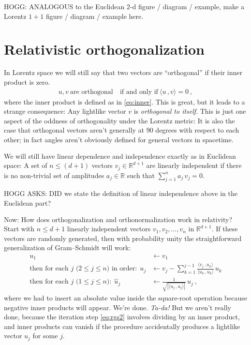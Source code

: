 \documentclass{article}
\newcommand{\inner}[2]{\langle{#1}\,,{#2}\rangle}
\newcommand{\plus}{\!+\!} %
\begin{document}
HOGG: ANALOGOUS to the Euclidean 2-d figure / diagram / example, make a Lorentz $1\plus1$ figure / diagram / example here.

\section{Relativistic orthogonalization}\label{sec:orth}

In Lorentz space we will still say that two vectors are ``orthogonal'' if their inner product is zero.
\begin{align}
    u,v ~\mbox{are orthogonal} ~ &\mbox{if and only if} ~ \inner{u}{v}=0 ~,
\end{align}
where the inner product is defined as in \eqref{eq:inner}.
This is great, but it leads to a strange consequence:
Any lightlike vector $v$ is \emph{orthogonal to itself}.
This is just one aspect of the oddness of orthogonality under the Lorentz metric:
It is also the case that orthogonal vectors aren't generally at 90 degrees with respect to each other; in fact angles aren't obviously defined for general vectors in spacetime.

We will still have linear dependence and independence exactly as in Euclidean space:
A set of $n\leq(d+1)$ vectors $v_j\in\mathbb{R}^{d+1}$ are linearly independent if there is no non-trivial set of amplitudes $a_j\in\mathbb{R}$ such that $\sum_{j=1}^n a_j\,v_j = 0$.

HOGG ASKS: DID we state the definition of linear independence above in the Euclidean part?

Now: How does orthogonalization and orthonormalization work in relativity?
Start with $n\leq d+1$ linearly independent vectors $v_1,v_2,\ldots,v_n$ in $\mathbb{R}^{d+1}$.
If these vectors are randomly generated, then with probability unity the straightforward generalization of Gram--Schmidt will work:
\begin{align}
    u_1 &\leftarrow v_1 \label{eq:rgs1}
    \\
    \mbox{then for each $j$ ($2\leq j\leq n$) in order:} ~~ u_j &\leftarrow v_j - \sum_{k=1}^{j-1} \frac{\inner{v_j}{u_k}}{\inner{u_k}{u_k}}\,u_k \label{eq:rgs2}
    \\
    \mbox{then for each $j$ ($1\leq j\leq n$):} ~~ \hat{u}_j &\leftarrow \frac{1}{\sqrt{|\inner{u_j}{u_j}|}}\,u_j ~, \label{eq:rgs3}
\end{align}
where we had to insert an absolute value inside the square-root operation because negative inner products will appear.
We're done. \emph{Ta-da!}
But we aren't really done, because the iteration step \eqref{eq:rgs2} involves dividing by an inner product, and inner products can vanish if the procedure accidentally produces a lightlike vector $u_j$ for some $j$.
\end{document}
